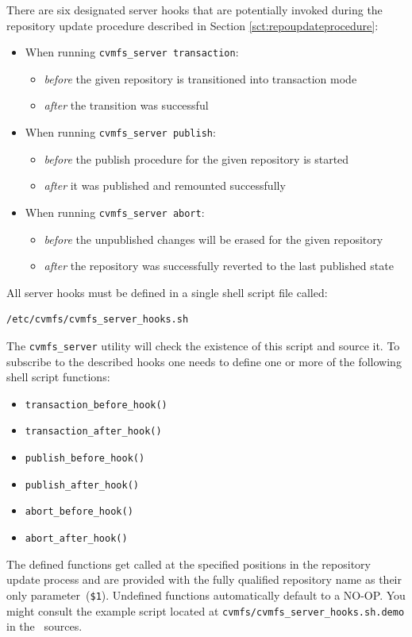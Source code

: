 There are six designated server hooks that are potentially invoked during the repository update procedure described in Section \ref{sct:repoupdateprocedure}:
\begin{itemize}
	\item When running \texttt{cvmfs\_server transaction}:
	\begin{itemize}
		\item \emph{before} the given repository is transitioned into transaction mode
		\item \emph{after} the transition was successful
	\end{itemize}
	\item When running \texttt{cvmfs\_server publish}:
	\begin{itemize}
		\item \emph{before} the publish procedure for the given repository is started
		\item \emph{after} it was published and remounted successfully
	\end{itemize}
	\item When running \texttt{cvmfs\_server abort}:
	\begin{itemize}
		\item \emph{before} the unpublished changes will be erased for the given repository
		\item \emph{after} the repository was successfully reverted to the last published state
	\end{itemize}
\end{itemize}
All server hooks must be defined in a single shell script file called:
\begin{verbatim}
/etc/cvmfs/cvmfs_server_hooks.sh
\end{verbatim}
The \texttt{cvmfs\_server} utility will check the existence of this script and source it.
To subscribe to the described hooks one needs to define one or more of the following shell script functions:
\begin{itemize}
	\setlength{\itemsep}{1pt}
	\item \texttt{transaction\_before\_hook()}
	\item \texttt{transaction\_after\_hook()}
\end{itemize}
\begin{itemize}
	\item \texttt{publish\_before\_hook()}
	\item \texttt{publish\_after\_hook()}
\end{itemize}
\begin{itemize}
	\item \texttt{abort\_before\_hook()}
	\item \texttt{abort\_after\_hook()}
\end{itemize}
The defined functions get called at the specified positions in the repository update process and are provided with the fully qualified repository name as their only parameter~(\texttt{\$1}).
Undefined functions automatically default to a NO-OP.
You might consult the example script located at \texttt{cvmfs/cvmfs\_server\_hooks.sh.demo} in the \cvmfs\ sources.


